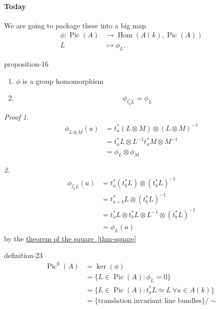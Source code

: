 \documentclass[10pt,]{book}
\makeatletter
\renewcommand*{\proofname}{Proof}
\renewenvironment{proof}[1][\proofname]{\par
  \pushQED{\qed}%
  \normalfont \topsep6\p@\@plus6\p@\relax
  \trivlist
  \item\relax
    {\itshape
    #1\@addpunct{.}}\hspace\labelsep\ignorespaces
}{%
  \popQED\endtrivlist\@endpefalse
}
\numberwithin{equation}{section}
\DeclareMathOperator{\Hom}{Hom}
\DeclareMathOperator{\Pic}{Pic}
\newcommand{\amp}{&}
\makeatother
\begin{document}
\paragraph[{Today}]{Today}\hypertarget{paragraphs-4}{}
\hypertarget{p-166}{}%
We are going to package these into a big map%
\begin{align*}
\phi\colon \Pic(A)\amp\to \Hom(A(k), \Pic(A))\\
L \amp\mapsto \phi_L\text{.}
\end{align*}
%
\begin{proposition}{}{}{proposition-16}%
\hypertarget{p-167}{}%
\leavevmode%
\begin{enumerate}
\item\hypertarget{li-27}{}\(\phi\) is a group homomorphism%
\item\hypertarget{li-28}{}%
\begin{equation*}
\phi_{t_a^* L}  = \phi_L
\end{equation*}
%
\end{enumerate}
%
\end{proposition}
\begin{proof}\hypertarget{proof-32}{}
\hypertarget{case-5}{}\textit{1}. \hypertarget{p-168}{}%
%
\begin{align*}
\phi_{L\otimes M}(a) \amp = t_a^*(L\otimes M) \otimes(L\otimes M)^{-1}\\
\amp = t_a^*L\otimes L^{-1} t_a^*M\otimes M^{-1}\\
\amp = \phi_L\otimes \phi_M
\end{align*}
%
\par\medskip\noindent
\hypertarget{case-6}{}\textit{2}. \hypertarget{p-169}{}%
%
\begin{align*}
\phi_{t_b^*L}(a) \amp = t_a^*(t_b^*L) \otimes(t_b^*L)^{-1}\\
\amp = t_{a+b}^*L \otimes(t_b^*L)^{-1}\\
\amp = t_{a}^*L \otimes t_b^*L \otimes L^{-1} \otimes (t_b^*L)^{-1}\\
\amp = \phi_L(a)
\end{align*}
by  the \hyperref[thm-square]{theorem of the square~\ref{thm-square}}%
\end{proof}
\begin{definition}{}{definition-23}%
\hypertarget{p-170}{}%
%
\begin{align*}
\Pic^0(A) \amp = \ker(\phi)\\
\amp = \{ L \in \Pic(A) : \phi_L = 0\}\\
\amp = \{ L \in \Pic(A) : t_a^* L\simeq L \ \forall a\in A(k)\}\\
\amp = \{\text{translation invariant line bundles}\}/\sim
\end{align*}
%
\end{definition}
%
%
\typeout{************************************************}
\typeout{************************************************}
%
\end{document}
